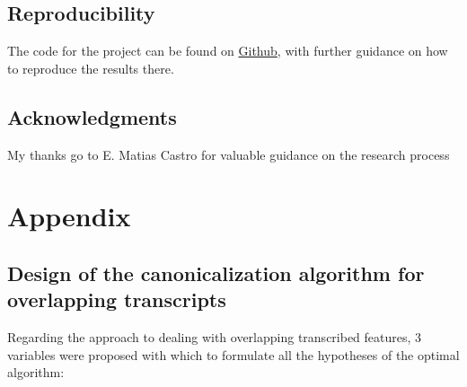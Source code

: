 \documentclass[   ]{article}
\begin{document}
\subsection*{Reproducibility}
The code for the project can be found on \href{https://github.com/PipeVerri/Canonicalization}{Github}, with further guidance on how to reproduce the results there.

\subsection*{Acknowledgments}
My thanks go to E. Matias Castro for valuable guidance on the research process




\appendix
\section{Appendix}

\subsection{Design of the canonicalization algorithm for overlapping transcripts}\label{sec:design-of-the-canonicalization-algorithm}
Regarding the approach to dealing with overlapping transcribed
features, 3 variables were proposed with which to formulate all the
hypotheses of the optimal algorithm: 
\end{document}
